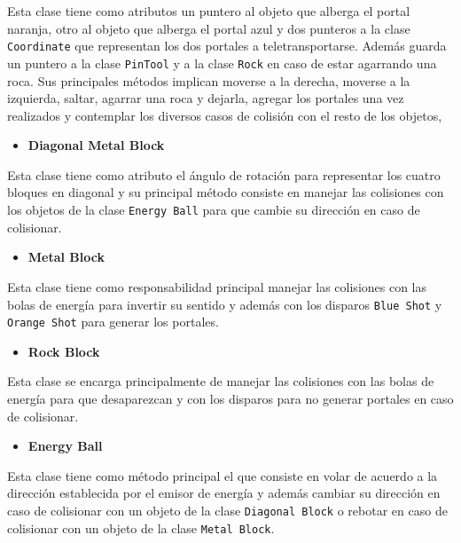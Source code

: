 \documentclass[a4paper]{article}
\begin{document}
Esta clase tiene como atributos un puntero al objeto que alberga el portal naranja, otro al objeto que alberga el portal azul y dos punteros a la clase \texttt{Coordinate} que representan los dos portales a teletransportarse. Además guarda un puntero a la clase \texttt{PinTool} y a la clase \texttt{Rock} en caso de estar agarrando una roca. Sus principales métodos implican moverse a la derecha, moverse a la izquierda, saltar, agarrar una roca y dejarla, agregar los portales una vez realizados y contemplar los diversos casos de colisión con el resto de los objetos,

\begin{itemize}
	\item \textbf{Diagonal Metal Block}
\end{itemize}

Esta clase tiene como atributo el ángulo de rotación para representar los cuatro bloques en diagonal y su principal método consiste en manejar las colisiones con los objetos de la clase \texttt{Energy Ball} para que cambie su dirección en caso de colisionar.

\begin{itemize}
	\item \textbf{Metal Block}
\end{itemize}

Esta clase tiene como responsabilidad principal manejar las colisiones con las bolas de energía para invertir su sentido y además con los disparos \texttt{Blue Shot} y \texttt{Orange Shot} para generar los portales.

\begin{itemize}
	\item \textbf{Rock Block}
\end{itemize}

Esta clase se encarga principalmente de manejar las colisiones con las bolas de energía para que desaparezcan y con los disparos para no generar portales en caso de colisionar.

\newpage

\begin{itemize}
	\item \textbf{Energy Ball}
\end{itemize}

Esta clase tiene como método principal el que consiste en volar de acuerdo a la dirección establecida por el emisor de energía y además cambiar su dirección en caso de colisionar con un objeto de la clase \texttt{Diagonal Block} o rebotar en caso de colisionar con un objeto de la clase \texttt{Metal Block}.
\end{document}
